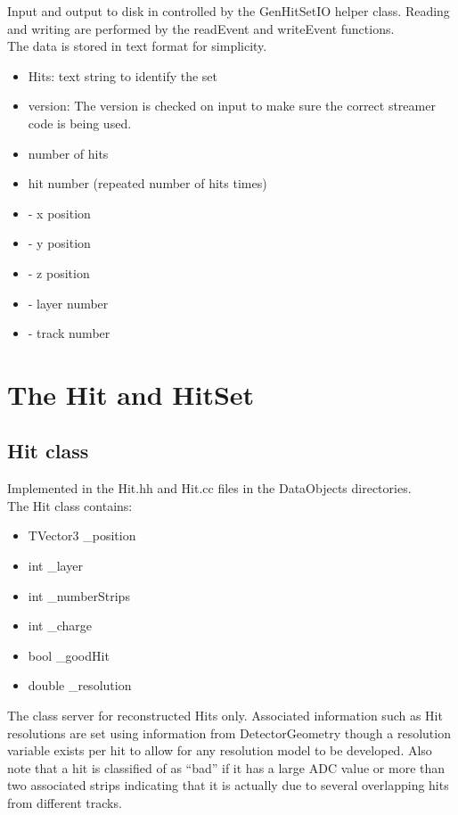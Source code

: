 \documentclass[aps,prd,superscriptaddress,floatfix]{revtex4}
\begin{document}
Input and output to disk in controlled by the GenHitSetIO helper class.  Reading and writing
are performed by the readEvent and writeEvent functions.
\\

The data is stored in text format for simplicity.

\begin{itemize}
\item  Hits: text string to identify the set
\item version: The version is checked on input to make sure the correct streamer code is being used.
\item number of hits
\item hit number (repeated number of hits times)
\item - x position
\item - y position
\item - z position
\item - layer number
\item - track number 
\end{itemize}

\section{The Hit and HitSet}
\subsection{Hit class}
Implemented in the Hit.hh and Hit.cc files in the DataObjects directories.
\\

The Hit class contains:\\

\begin{itemize}
\item TVector3 \_position
\item int \_layer
\item int \_numberStrips
\item int \_charge
\item bool \_goodHit
\item double \_resolution 
\end{itemize}


The class server for reconstructed Hits only.   Associated information such as Hit resolutions
are set using information from DetectorGeometry though a resolution variable exists per hit to allow for any resolution model
to be developed.  Also note that a hit is classified of as ``bad'' if it has a large ADC
value or more than two associated strips indicating that it is actually due to several overlapping hits from
different tracks.
\\
\end{document}
